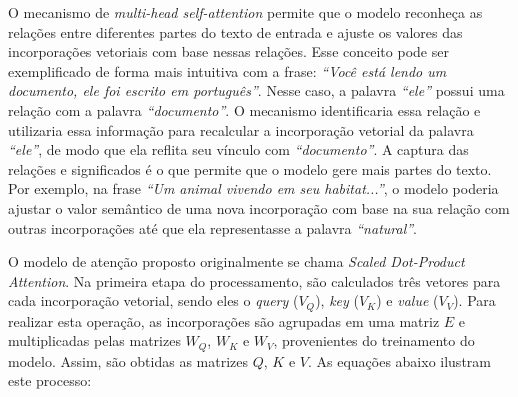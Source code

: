 O mecanismo de \textit{multi-head self-attention} permite que o modelo reconheça as relações entre diferentes partes do texto de entrada e ajuste os valores das
incorporações vetoriais com base nessas relações. Esse conceito pode ser exemplificado de forma mais intuitiva com a frase: \textit{``Você está lendo um documento, ele
      foi escrito em português''}. Nesse caso, a palavra \textit{``ele''} possui uma relação com a palavra \textit{``documento''}. O mecanismo identificaria essa relação e
utilizaria essa informação para recalcular a incorporação vetorial da palavra \textit{``ele''}, de modo que ela reflita seu vínculo com \textit{``documento''}. A captura
das relações e significados é o que permite que o modelo gere mais partes do texto. Por exemplo, na frase \textit{``Um animal vivendo em seu habitat...''}, o modelo
poderia ajustar o valor semântico de uma nova incorporação com base na sua relação com outras incorporações até que ela representasse a palavra \textit{``natural''}.

O modelo de atenção proposto originalmente se chama \textit{Scaled Dot-Product Attention}. Na primeira etapa do processamento, são calculados três vetores para cada
incorporação vetorial, sendo eles o \textit{query} (\begin{math}V_Q\end{math}), \textit{key} (\begin{math}V_K\end{math}) e \textit{value} (\begin{math}V_V\end{math}).
Para realizar esta operação, as incorporações são agrupadas em uma matriz \begin{math}E\end{math} e multiplicadas pelas matrizes \begin{math}W_Q\end{math},
\begin{math}W_K\end{math} e \begin{math}W_V\end{math}, provenientes do treinamento do modelo. Assim, são obtidas as matrizes \begin{math}Q\end{math},
\begin{math}K\end{math} e \begin{math}V\end{math}. As equações abaixo ilustram este processo:

